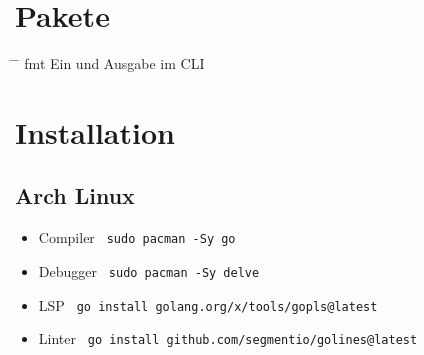 \documentclass[a4paper,12pt,twoside]{article}
\begin{document}
\section{Pakete}
\begin{tabbing}
 \hspace{2mm} \= \hspace{50mm} \= \kill
\> fmt \> Ein und Ausgabe im CLI \\
\end{tabbing}


\section{Installation}
\subsection{Arch Linux}
\begin{itemize}
  \item Compiler \verb| sudo pacman -Sy go |
  \item Debugger \verb| sudo pacman -Sy delve |
  \item LSP \verb| go install golang.org/x/tools/gopls@latest |
  \item Linter \verb| go install github.com/segmentio/golines@latest |
\end{itemize}
\end{document}

